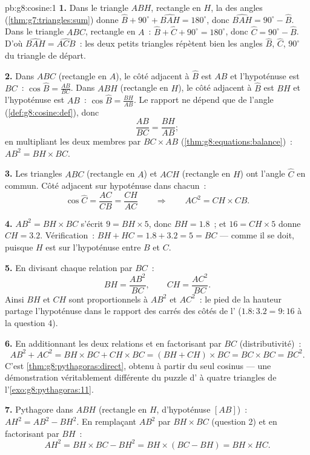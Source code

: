 \begin{solution}{pb:g8:cosine:1}
\textbf{1.} Dans le triangle $ABH$, rectangle en $H$, la  des
angles (\cref{thm:g7:triangles:sum}) donne
$\widehat B + 90^\circ + \widehat{BAH} = 180^\circ$, donc
$\widehat{BAH} = 90^\circ - \widehat B$. Dans le triangle $ABC$,
rectangle en $A$~: $\widehat B + \widehat C + 90^\circ = 180^\circ$,
donc $\widehat C = 90^\circ - \widehat B$. D'où
$\widehat{BAH} = \widehat{ACB}$~: les deux petits triangles répètent
bien les angles $\widehat B$, $\widehat C$, $90^\circ$ du triangle
de départ.

\textbf{2.} Dans $ABC$ (rectangle en $A$), le côté adjacent à
$\widehat B$ est $AB$ et l'hypoténuse est $BC$~:
$\cos\widehat B = \frac{AB}{BC}$. Dans $ABH$ (rectangle en $H$), le
côté adjacent à $\widehat B$ est $BH$ et l'hypoténuse est $AB$~:
$\cos\widehat B = \frac{BH}{AB}$. Le rapport ne dépend que de
l'angle (\cref{def:g8:cosine:def}), donc
\[
\frac{AB}{BC} = \frac{BH}{AB} ;
\]
en multipliant les deux membres par $BC \times AB$
(\cref{thm:g8:equations:balance})~: $AB^2 = BH \times BC$.

\textbf{3.} Les triangles $ABC$ (rectangle en $A$) et $ACH$
(rectangle en $H$) ont l'angle $\widehat C$ en commun. Côté adjacent
sur hypoténuse dans chacun~:
\[
\cos\widehat C = \frac{AC}{CB} = \frac{CH}{AC}
\qquad\Longrightarrow\qquad
AC^2 = CH \times CB .
\]

\textbf{4.} $AB^2 = BH \times BC$ s'écrit $9 = BH \times 5$, donc
$BH = 1.8$~; et $16 = CH \times 5$ donne $CH = 3.2$. Vérification~:
$BH + HC = 1.8 + 3.2 = 5 = BC$ --- comme il se doit, puisque $H$ est
sur l'hypoténuse entre $B$ et $C$.

\textbf{5.} En divisant chaque relation par $BC$~:
\[
BH = \frac{AB^2}{BC},
\qquad
CH = \frac{AC^2}{BC} .
\]
Ainsi $BH$ et $CH$ sont proportionnels à $AB^2$ et $AC^2$~: le pied
de la hauteur partage l'hypoténuse dans le rapport des carrés des
côtés de l' ($1.8 : 3.2 = 9 : 16$ à la question 4).

\textbf{6.} En additionnant les deux relations et en factorisant par
$BC$ (distributivité)~:
\[
AB^2 + AC^2 = BH \times BC + CH \times BC
= (BH + CH) \times BC = BC \times BC = BC^2 .
\]
C'est \cref{thm:g8:pythagoras:direct}, obtenu à partir du seul
cosinus --- une démonstration véritablement différente du puzzle
d' à quatre triangles de l'\cref{exo:g8:pythagoras:11}.

\textbf{7.} Pythagore dans $ABH$ (rectangle en $H$, d'hypoténuse
$[AB]$)~: $AH^2 = AB^2 - BH^2$. En remplaçant $AB^2$ par
$BH \times BC$ (question 2) et en factorisant par $BH$~:
\[
AH^2 = BH \times BC - BH^2
= BH \times (BC - BH)
= BH \times HC .
\]


\end{solution}
